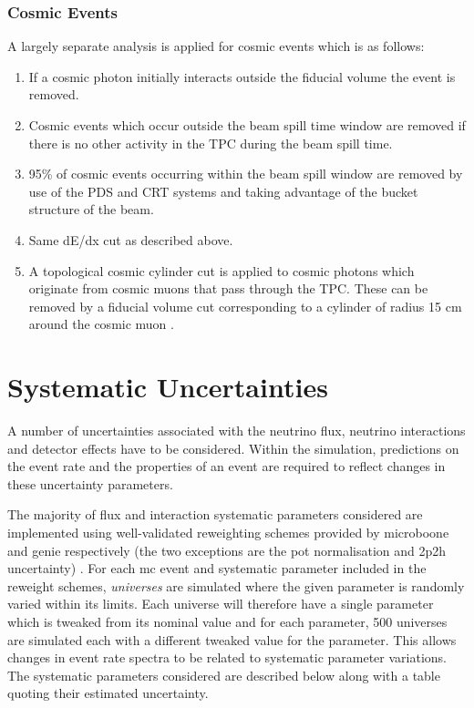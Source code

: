 \subsubsection*{Cosmic Events}
A largely separate analysis is applied for cosmic events which is as follows:
\begin{enumerate}
    \item  If a cosmic photon initially interacts outside the fiducial volume the event is removed.
    \item Cosmic events which occur outside the beam spill time window are removed if there is no other activity in the TPC during the beam spill time.
    \item 95\% of cosmic events occurring within the beam spill window are removed by use of the PDS and CRT systems and taking advantage of the bucket structure of the beam.
    \item Same dE/dx cut as described above. 
    \item A topological cosmic cylinder cut is applied to cosmic photons which originate from cosmic muons that pass through the TPC. These can be removed by a fiducial volume cut corresponding to a cylinder of radius 15 cm around the cosmic muon \cite{Dom's_thesis}. 
\end{enumerate}


\clearpage
\section{Systematic Uncertainties}\label{sec:syst_uncertainties}
A number of uncertainties associated with the neutrino flux, neutrino interactions and detector effects have to be considered. Within the simulation, predictions on the event rate and the properties of an event are required to reflect changes in these uncertainty parameters. 

The majority of flux and interaction systematic parameters considered are implemented using well-validated reweighting schemes provided by \gls{microboone} and \gls{genie} respectively (the two exceptions are the \gls{pot} normalisation and \gls{2p2h} uncertainty) \cite{BNB_flux}\cite{GENIE_manual}. For each \gls{mc} event and systematic parameter included in the reweight schemes, \textit{universes} are simulated where the given parameter is randomly varied within its limits. Each universe will therefore have a single parameter which is tweaked from its nominal value and for each parameter, 500 universes are simulated each with a different tweaked value for the parameter. This allows changes in event rate spectra to be related to systematic parameter variations. The systematic parameters considered are described below along with a table quoting their estimated uncertainty. 

